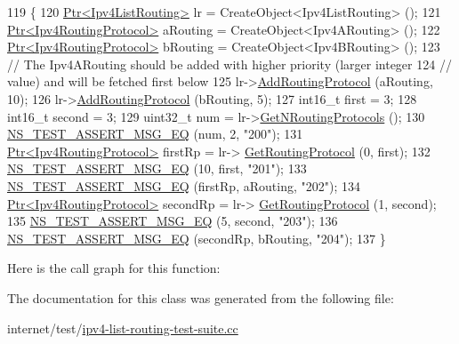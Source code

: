 \begin{DoxyCode}
119 \{
120   \hyperlink{classns3_1_1Ptr}{Ptr<Ipv4ListRouting>} lr = CreateObject<Ipv4ListRouting> ();
121   \hyperlink{classns3_1_1Ptr}{Ptr<Ipv4RoutingProtocol>} aRouting = CreateObject<Ipv4ARouting> ();
122   \hyperlink{classns3_1_1Ptr}{Ptr<Ipv4RoutingProtocol>} bRouting = CreateObject<Ipv4BRouting> ();
123   \textcolor{comment}{// The Ipv4ARouting should be added with higher priority (larger integer}
124   \textcolor{comment}{// value) and will be fetched first below}
125   lr->\hyperlink{classns3_1_1Ipv4ListRouting_aac3d4da5db389114e7b980c6136f11a2}{AddRoutingProtocol} (aRouting, 10);
126   lr->\hyperlink{classns3_1_1Ipv4ListRouting_aac3d4da5db389114e7b980c6136f11a2}{AddRoutingProtocol} (bRouting, 5);
127   int16\_t first = 3;
128   int16\_t second = 3;
129   uint32\_t num = lr->\hyperlink{classns3_1_1Ipv4ListRouting_ace90506497803859bebb5cbfa04b56ce}{GetNRoutingProtocols} ();
130   \hyperlink{group__testing_ga2a9d78cffb3db8e867c35fff0b698cf5}{NS\_TEST\_ASSERT\_MSG\_EQ} (num, 2, \textcolor{stringliteral}{"200"});
131   \hyperlink{classns3_1_1Ptr}{Ptr<Ipv4RoutingProtocol>} firstRp = lr->
      \hyperlink{classns3_1_1Ipv4ListRouting_a1c47488f8ed4775ff5c33add867652b9}{GetRoutingProtocol} (0, first);
132   \hyperlink{group__testing_ga2a9d78cffb3db8e867c35fff0b698cf5}{NS\_TEST\_ASSERT\_MSG\_EQ} (10, first, \textcolor{stringliteral}{"201"});
133   \hyperlink{group__testing_ga2a9d78cffb3db8e867c35fff0b698cf5}{NS\_TEST\_ASSERT\_MSG\_EQ} (firstRp, aRouting, \textcolor{stringliteral}{"202"});
134   \hyperlink{classns3_1_1Ptr}{Ptr<Ipv4RoutingProtocol>} secondRp = lr->
      \hyperlink{classns3_1_1Ipv4ListRouting_a1c47488f8ed4775ff5c33add867652b9}{GetRoutingProtocol} (1, second);
135   \hyperlink{group__testing_ga2a9d78cffb3db8e867c35fff0b698cf5}{NS\_TEST\_ASSERT\_MSG\_EQ} (5, second, \textcolor{stringliteral}{"203"});
136   \hyperlink{group__testing_ga2a9d78cffb3db8e867c35fff0b698cf5}{NS\_TEST\_ASSERT\_MSG\_EQ} (secondRp, bRouting, \textcolor{stringliteral}{"204"});
137 \}
\end{DoxyCode}


Here is the call graph for this function\+:




The documentation for this class was generated from the following file\+:\begin{DoxyCompactItemize}
\item 
internet/test/\hyperlink{ipv4-list-routing-test-suite_8cc}{ipv4-\/list-\/routing-\/test-\/suite.\+cc}\end{DoxyCompactItemize}
